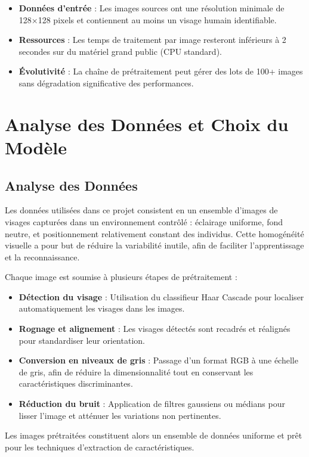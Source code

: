 \documentclass[a4paper,12pt]{report} %
\begin{document}
\begin{block}[Hypothèse]
\begin{itemize}
    \item \textbf{Données d'entrée} : Les images sources ont une résolution minimale de 128×128 pixels et contiennent au moins un visage humain identifiable.
    \item \textbf{Ressources} : Les temps de traitement par image resteront inférieurs à 2 secondes sur du matériel grand public (CPU standard).
    \item \textbf{Évolutivité} : La chaîne de prétraitement peut gérer des lots de 100+ images sans dégradation significative des performances.
\end{itemize}
\end{block}

\chapter{Analyse des Données et Choix du Modèle}
\section*{Analyse des Données}
Les données utilisées dans ce projet consistent en un ensemble d'images de visages capturées dans un environnement contrôlé : éclairage uniforme, fond neutre, et positionnement relativement constant des individus. Cette homogénéité visuelle a pour but de réduire la variabilité inutile, afin de faciliter l'apprentissage et la reconnaissance.

Chaque image est soumise à plusieurs étapes de prétraitement :
\begin{itemize}
    \item \textbf{Détection du visage} : Utilisation du classifieur Haar Cascade pour localiser automatiquement les visages dans les images.
    \item \textbf{Rognage et alignement} : Les visages détectés sont recadrés et réalignés pour standardiser leur orientation.
    \item \textbf{Conversion en niveaux de gris} : Passage d'un format RGB à une échelle de gris, afin de réduire la dimensionnalité tout en conservant les caractéristiques discriminantes.
    \item \textbf{Réduction du bruit} : Application de filtres gaussiens ou médians pour lisser l'image et atténuer les variations non pertinentes.
\end{itemize}

Les images prétraitées constituent alors un ensemble de données uniforme et prêt pour les techniques d'extraction de caractéristiques.
\end{document}
